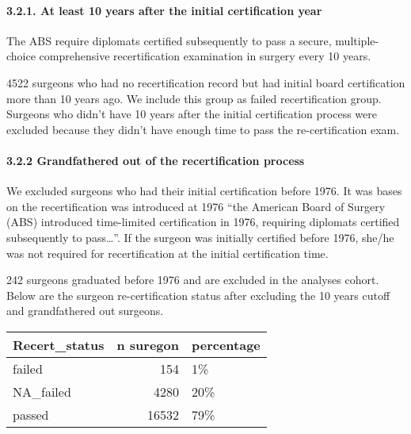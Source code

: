 \documentclass[
]{article}
\begin{document}
\hypertarget{at-least-10-years-after-the-initial-certification-year}{%
\paragraph{3.2.1. At least 10 years after the initial certification
year}\label{at-least-10-years-after-the-initial-certification-year}}

The ABS require diplomats certified subsequently to pass a secure,
multiple-choice comprehensive recertification examination in surgery
every 10 years.

4522 surgeons who had no recertification record but had initial board
certification more than 10 years ago. We include this group as failed
recertification group. Surgeons who didn't have 10 years after the
initial certification process were excluded because they didn't have
enough time to pass the re-certification exam.

\hypertarget{grandfathered-out-of-the-recertification-process}{%
\paragraph{3.2.2 Grandfathered out of the recertification
process}\label{grandfathered-out-of-the-recertification-process}}

We excluded surgeons who had their initial certification before 1976. It
was bases on the recertification was introduced at 1976 ``the American
Board of Surgery (ABS) introduced time-limited certification in 1976,
requiring diplomats certified subsequently to pass\ldots{}''. If the
surgeon was initially certified before 1976, she/he was not required for
recertification at the initial certification time.

242 surgeons graduated before 1976 and are excluded in the analyses
cohort. Below are the surgeon re-certification status after excluding
the 10 years cutoff and grandfathered out surgeons.

\begin{table}[H]
\centering
\begin{tabular}{l|r|l}
\hline
Recert\_status & n suregon & percentage\\
\hline
failed & 154 & 1\%\\
\hline
NA\_failed & 4280 & 20\%\\
\hline
passed & 16532 & 79\%\\
\hline
\end{tabular}
\end{table}
\end{document}
